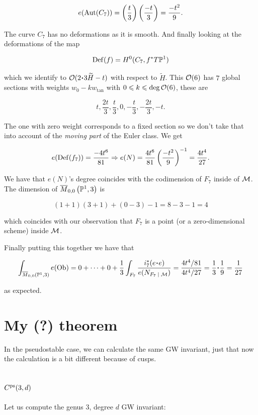 \documentclass[12pt]{memoir}
\begin{document}
\[e(\operatorname{Aut}(C_7))=\left(\frac{t}{3}\right)\left(\frac{-t}{3}\right)=\frac{-t^2}{9}.\]

The curve \(C_7\) has no deformations as it is smooth. And finally looking at the deformations of the map

\[\operatorname{Def}(f)=H^0(C_7,f^\ast T\mathbb{P}^1)\]

which we identify to \(\cO(2\.3\widetilde{H}-t)\) with respect to \(\widetilde{H}\). This \(\mathcal{O}(6)\) has \(7\) global sections with weights \(w_0-kw_{\tan}\) with \(0\leqslant k\leqslant \deg\mathcal{O}(6)\), these are

\[t,\frac{2t}{3},\frac t3,0,-\frac t3,-\frac{2t}{3},-t.\]

The one with zero weight corresponds to a fixed section so we don't take that into account of the \emph{moving part} of the Euler class. We get

\[e(\operatorname{Def}(f_7))=\frac{-4t^6}{81}\Rightarrow e(N)=\frac{4t^6}{81}\left(\frac{-t^2}{9}\right)^{-1}=\frac{4t^4}{27}.\]

\begin{Rmk}
    We have that \(e(N)\)'s degree coincides with the codimension of \(F_7\) inside of \(\mathcal{M}\). The dimension of \(\overline{M}_{0,0}\left(\mathbb{P}^1,3\right)\) is

    \[(1+1)(3+1)+(0-3)-1=8-3-1=4\]

    which coincides with our observation that \(F_7\) is a point (or a zero-dimensional scheme) inside \(\mathcal{M}\).
\end{Rmk}

Finally putting this together we have that


\[\int_{\ov{M}_{0,0}(\bP^1,3)}e(\Ob)=0+\dots+0+\frac13\int_{F_7}\frac{i_7^\ast(e\.e)}{e(N_{F_7\mid\cM})}=\frac{{4t^4}/{81}}{{4t^4}/{27}}=\frac13\.\frac19=\frac{1}{27}\]


as expected.

\section{My (?) theorem}

In the pseudostable case, we can calculate the same GW invariant, just that now the calculation is a bit different because of cusps.

\subsection{\(C^{\operatorname{\mathrm{ps}}}(3,d)\)}

Let us compute the genus 3, degree \(d\) GW invariant:
\end{document}
